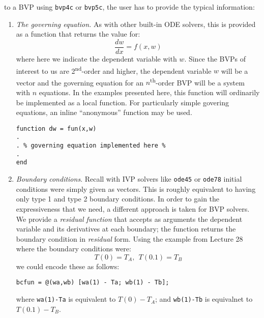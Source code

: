 to a BVP using \lstinline[style=myMatlab]{bvp4c} or \lstinline[style=myMatlab]{bvp5c}, the user has to provide the typical information:
\begin{enumerate}
\item \emph{The governing equation.} As with other built-in ODE solvers, this is provided as a function that returns the value for:
\begin{equation*}
\frac{dw}{dx} = f(x,w)
\end{equation*}
where here we indicate the dependent variable with $w$.  Since the BVPs of interest to us are 2\textsuperscript{nd}-order and higher, the dependent variable $w$ will be a vector and the governing equation for an $n$\textsuperscript{th}-order BVP will be a system with $n$ equations.  In the examples presented here, this function will ordinarily be implemented as a local function.  For particularly simple govering equations, an inline ``anonymous'' function may be used.
\begin{lstlisting}[style=myMatlab]
function dw = fun(x,w)
.
. % governing equation implemented here %
.
end
\end{lstlisting}

\item \emph{Boundary conditions}.  Recall with IVP solvers like \lstinline[style=myMatlab]{ode45} or \lstinline[style=myMatlab]{ode78} initial conditions were simply given as vectors.  This is roughly equivalent to having only type 1 and type 2 boundary conditions.  In order to gain the expressiveness that we need, a different approach is taken for BVP solvers.  We provide a \emph{residual function} that accepts as arguments the dependent variable and its derivatives at each boundary; the function returns the boundary condition in \emph{residual} form.  Using the example from Lecture 28 where the boundary conditions were:
\begin{equation*}
T(0) = T_A, \ \ T(0.1) = T_B
\end{equation*}
we could encode these as follows:
\begin{lstlisting}[style=myMatlab]
bcfun = @(wa,wb) [wa(1) - Ta; wb(1) - Tb];
\end{lstlisting}
where \lstinline[style=myMatlab]{wa(1)-Ta} is equivalent to $T(0)-T_A$; and \lstinline[style=myMatlab]{wb(1)-Tb} is equivalnet to $T(0.1)-T_B$.


\end{enumerate}

